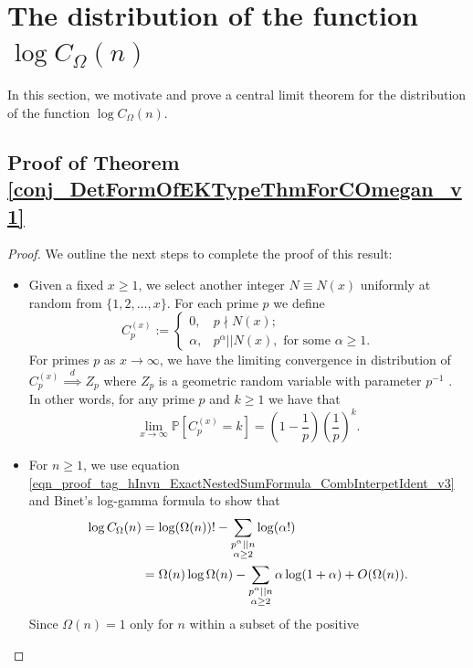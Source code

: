\documentclass[11pt,reqno,a4letter]{article}
\newcommand{\hlocalref}[1]{\hyperref[#1]{\ref{#1}}}
\numberwithin{equation}{section}
\numberwithin{figure}{section}
\numberwithin{table}{section}
\let\citep\cite
\theoremstyle{plain}
\numberwithin{theorem}{section}
\theoremstyle{definition}
\theoremstyle{remark}
\begin{document}
\section{The distribution of the function $\log C_{\Omega}(n)$} 
\label{subSection_ErdosKacTheorem_Analogs} 

In this section, we motivate and prove a central limit theorem 
for the distribution of the function $\log C_{\Omega}(n)$. 

\subsection{Proof of Theorem \hlocalref{conj_DetFormOfEKTypeThmForCOmegan_v1}}

\begin{proof}
We outline the next steps to complete the proof of this result: 
\begin{itemize}
\item
Given a fixed $x \geq 1$, we select another integer $N \equiv N(x)$ uniformly at random from 
$\{1,2,\ldots,x\}$. For each prime $p$ we define 
\[
C_p^{(x)} := \begin{cases} 0, & p \nmid N(x); \\ 
	\alpha, & p^{\alpha} || N(x), \text{ for some } \alpha \geq 1. 
	\end{cases}
\]
For primes $p$ as $x \rightarrow \infty$, 
we have the limiting convergence in distribution of 
$C_p^{(x)} \overset{d}{\implies} Z_p$ where $Z_p$ is 
a geometric random variable with parameter $p^{-1}$ 
\citep[\S 1.2]{LOG-COMB-STRUCTS-BOOK}. 
In other words, for any prime $p$ and $k \geq 1$ we have that 
\[
\lim_{x \rightarrow \infty} \mathbb{P}\left[C_p^{(x)} = k\right] = 
     \left(1 - \frac{1}{p}\right)\left(\frac{1}{p}\right)^k. 
\]
\item 
For $n \geq 1$, we use 
equation \eqref{eqn_proof_tag_hInvn_ExactNestedSumFormula_CombInterpetIdent_v3} and 
Binet's log-gamma formula \cite[\S 5.9(i)]{NISTHB} to show that 
\begin{align}
\notag
\log C_{\Omega}(n) & = \log (\Omega(n))! - 
	\sum_{\substack{p^{\alpha}||n \\ \alpha \geq 2}} \log(\alpha!) \\ 
\label{eqn_remark_LogCOmegan_IntermedExp_v1}
	& = \Omega(n) \log \Omega(n) - \sum_{\substack{p^{\alpha}||n \\ \alpha \geq 2}} 
	\alpha \log(1 + \alpha) + O(\Omega(n)). 
\end{align}
Since $\Omega(n) = 1$ only for $n$ within a subset of the positive 

\end{itemize}
\end{proof}
\end{document}
